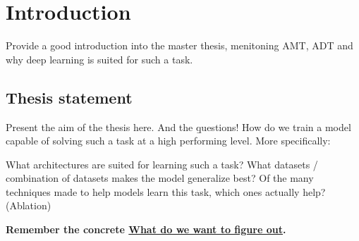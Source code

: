 \chapter{Introduction}

Provide a good introduction into the master thesis, menitoning \gls{AMT}, \gls{ADT} and why deep learning is suited for such a task.

\section{Thesis statement}

Present the aim of the thesis here. And the \b{questions!}
How do we train a model capable of solving such a task at a high performing level. More specifically:

What architectures are suited for learning such a task?
What datasets / combination of datasets makes the model generalize best?
Of the many techniques made to help models learn this task, which ones actually help? (Ablation)

\textbf{Remember the concrete \underline{What do we want to figure out}.}